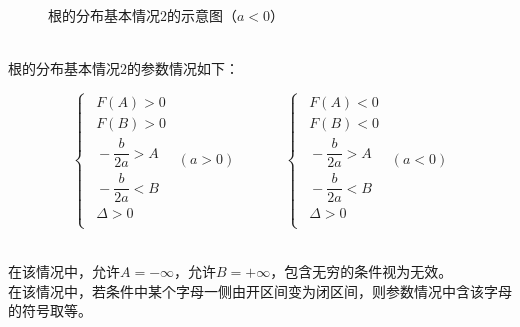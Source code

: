 \documentclass[UTF8]{ctexart}
\begin{document}
    \begin{figure}[h]
        \begin{center}
            \caption{根的分布基本情况$2$的示意图（$a<0$）}
        \end{center}
    \end{figure}\\
    根的分布基本情况$2$的参数情况如下：\vspace{5pt}
    \begin{large}
        \begin{equation*}
            \begin{cases}
                ~~F(A)>0\\[4mm]
                ~~F(B)>0\\[4mm]
                ~~-\dfrac{b}{2a}>A\\[4mm]
                ~~-\dfrac{b}{2a}<B\\[4mm]
                ~~\Delta>0\\[1mm]
            \end{cases}
            ~~(a>0)
            ~~~~~~~~~~~~~~~~
            \begin{cases}
                ~~F(A)<0\\[4mm]
                ~~F(B)<0\\[4mm]
                ~~-\dfrac{b}{2a}>A\\[4mm]
                ~~-\dfrac{b}{2a}<B\\[4mm]
                ~~\Delta>0\\[1mm]
            \end{cases}
            ~~(a<0)
        \end{equation*}
    \end{large}\\[1mm]
    在该情况中，允许$A=-\infty$，允许$B=+\infty$，包含无穷的条件视为无效。\\[3mm]
    在该情况中，若条件中某个字母一侧由开区间变为闭区间，则参数情况中含该字母的符号取等。
\end{document}
